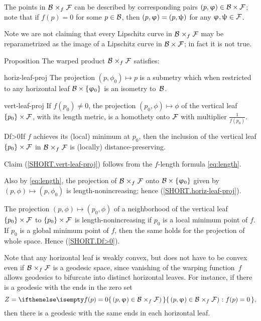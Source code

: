 The points in $\spc{B}\warp f\spc{F}$ can be described by corresponding pairs $(p,\phi)\in\spc{B}\times\spc{F}$; note that if $f(p)=0$ for some $p\in \spc{B}$, then $(p,\phi)\z=(p,\psi)$ for any $\phi,\psi\in \spc{F}$.

Note we are not claiming that every Lipschitz curve in $\spc{B}\warp f \spc{F}$ may be reparametrized as the image of a Lipschitz curve in $\spc{B}\times \spc{F}$; in fact it is not true.

\begin{thm}{Proposition}
The warped product $\spc{\spc{B}}\warp{f}\spc{F}$ satisfies:

\begin{subthm}{horiz-leaf-proj}
The projection $(p,\phi_0)\mapsto p$ is a submetry which when restricted to any horizontal leaf $\spc{B}\times\{\phi_0\}$
is an isometry to~$\mathcal{B}$.
\end{subthm}

\begin{subthm}{vert-leaf-proj}
If $f(p_0)\ne0$, the projection $(p_0,\phi)\mapsto \phi$ of the vertical leaf $\{p_0\}\times \spc{F}$, with its length metric,  is a homothety onto $\mathcal{F}$ with multiplier $\tfrac1{f(p_0)}$.
\end{subthm}

\begin{subthm}{Df>0}If  $f$ achieves its (local) minimum at $p_0$, then the inclusion of the vertical leaf $\{p_0\} \times \spc{F}$ in $\spc{B}\warp{f}\spc{F}$ is (locally) distance-preserving.
\end{subthm}

\end{thm}


Claim  (\ref{SHORT.vert-leaf-proj}) follows from the $f$-length formula \ref{eq:length}.

Also by \ref{eq:length}, the projection of
$\spc{B}\warp{f}\spc{F}$ onto $\spc{B}\times\{\phi_0\}$ given by  $(p,\phi)\mapsto (p,\phi_0)$ is length-nonincreasing; hence (\ref{SHORT.horiz-leaf-proj}).

The projection $(p,\phi)\mapsto (p_0,\phi)$ of a neighborhood of the vertical leaf $\{p_0\} \times \spc{F}$ to $\{p_0\} \times \spc{F}$ is length-nonincreasing if $p_0$ is a local minimum point of $f$. 
If $p_0$ is a global minimum point of $f$, then the same holds for the projection of whole space.
Hence (\ref{SHORT.Df>0}).
\qeds

Note that any horizontal leaf is weakly convex, but does not have to be convex even if $\spc{B}\warp{f}\spc{F}$ is a geodesic space, since vanishing of the warping function~$f$ allows geodesics to bifurcate into distinct horizontal leaves.
For instance, if there is a geodesic with the ends in the zero set 
\[Z=\set{(p,\phi)\in\spc{B} \warp{f}\spc{F})}{f(p)=0},\] 
then there is a geodesic with the same ends in each horizontal leaf.

